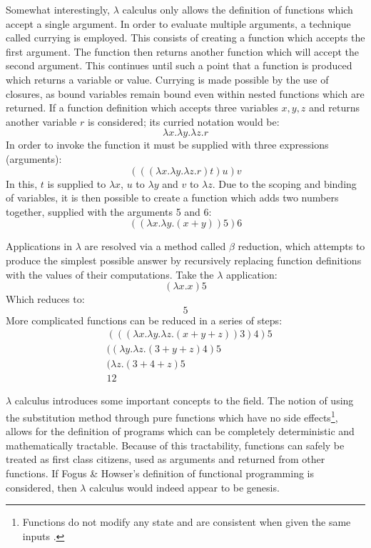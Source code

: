 \documentclass[12pt,a4paper]{article}
\begin{document}
Somewhat interestingly, $\lambda$ calculus only allows the definition of functions which accept a single argument. In order to evaluate multiple arguments, a technique called currying is employed. This consists of creating a function which accepts the first argument. The function then returns another function which will accept the second argument. This continues until such a point that a function is produced which returns a variable or value. Currying is made possible by the use of closures, as bound variables remain bound even within nested functions which are returned. If a function definition which accepts three variables $x,y,z$ and returns another variable $r$ is considered; its curried notation would be:
\begin{displaymath}
    \lambda x. \lambda y. \lambda z.r
\end{displaymath}
In order to invoke the function it must be supplied with three expressions (arguments):
\begin{displaymath}
    (((\lambda x. \lambda y. \lambda z.r) t ) u ) v
\end{displaymath}
In this, $t$ is supplied to $\lambda x$, $u$ to $\lambda y$ and $v$ to $\lambda z$. Due to the scoping and binding of variables, it is then possible to create a function which adds two numbers together, supplied with the arguments 5 and 6:
\begin{displaymath}
    ((\lambda x. \lambda y.(x+y) ) 5 ) 6
\end{displaymath}

Applications in $\lambda$ are resolved via a method called $\beta$ reduction, which attempts to produce the simplest possible answer by recursively replacing function definitions with the values of their computations. Take the $\lambda$ application:
\begin{displaymath}
    (\lambda x.x)5
\end{displaymath}
Which reduces to:
\begin{displaymath}
    5
\end{displaymath}
More complicated functions can be reduced in a series of steps:
\begin{align*}
    & (((\lambda x. \lambda y. \lambda z.(x + y + z))3)4)5 \\
    & ((\lambda y. \lambda z.(3  + y + z)4)5 \\
    & (\lambda z.(3 + 4 + z)5 \\
    & 12
\end{align*}

$\lambda$ calculus introduces some important concepts to the field. The notion of using the substitution method through pure functions which have no side effects\footnote{Functions do not modify any state and are consistent when given the same inputs \cite{sideEffects}.}, allows for the definition of programs which can be completely deterministic and mathematically tractable. Because of this tractability, functions can safely be treated as first class citizens, used as arguments and returned from other functions. If Fogus \& Howser's definition of functional programming is considered, then $\lambda$ calculus would indeed appear to be genesis. 
\end{document}
